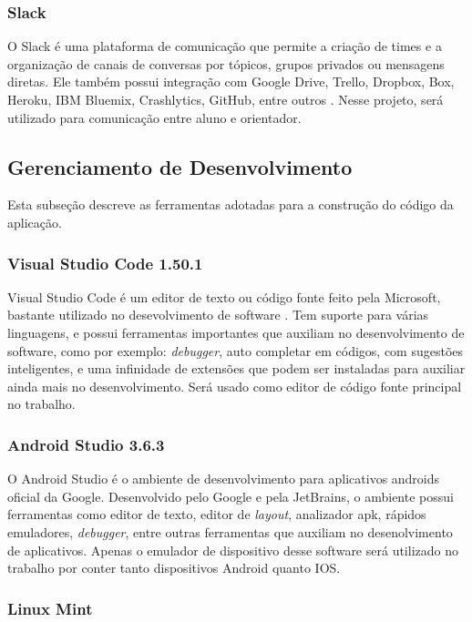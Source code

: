 \subsubsection{Slack}

O Slack é uma plataforma de comunicação que permite a criação de times e a 
organização de canais de conversas por tópicos, grupos privados ou mensagens 
diretas. Ele também possui integração com  Google Drive, Trello, Dropbox, Box, 
Heroku, IBM Bluemix, Crashlytics, GitHub, entre outros \cite{slack2013}. Nesse 
projeto, será utilizado para comunicação entre aluno e orientador.

\subsection{Gerenciamento de Desenvolvimento}

Esta subseção descreve as ferramentas adotadas para a construção do código da aplicação.

\subsubsection{Visual Studio Code 1.50.1}

Visual Studio Code é um editor de texto ou código fonte feito pela Microsoft, 
bastante utilizado no desevolvimento de software \cite{vscode2015}. Tem suporte 
para várias linguagens, e possui ferramentas importantes que auxiliam no 
desenvolvimento de software, como por exemplo: \emph{debugger}, auto completar em 
códigos, com sugestões inteligentes, e uma infinidade de extensões que podem ser instaladas para auxiliar ainda mais no desenvolvimento. Será usado como editor de código fonte principal no trabalho. 

\subsubsection{Android Studio 3.6.3}

O Android Studio \cite{android2020} é o ambiente de desenvolvimento para 
aplicativos androids oficial da Google. Desenvolvido pelo Google e pela 
JetBrains, o ambiente possui ferramentas como editor de texto, editor de \emph{layout}, 
analizador apk, rápidos emuladores, \emph{debugger}, entre outras ferramentas 
que auxiliam no desenolvimento de aplicativos. Apenas o emulador de dispositivo 
desse software será utilizado no trabalho por conter tanto dispositivos Android 
quanto IOS.

\subsubsection{Linux Mint}

